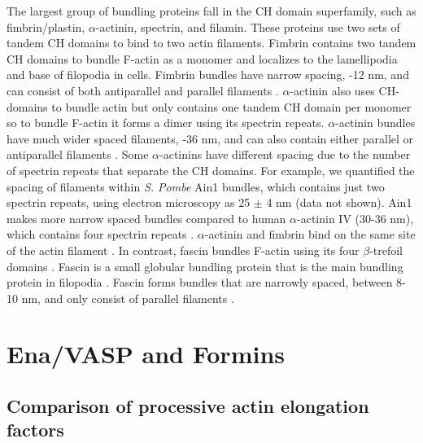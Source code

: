 The largest group of bundling proteins fall in the CH domain superfamily, such as fimbrin/plastin, $\alpha$-actinin, spectrin, and filamin. These proteins use two sets of tandem CH domains to bind to two actin filaments. Fimbrin contains two tandem CH domains to bundle F-actin as a monomer and localizes to the lamellipodia and base of filopodia in cells. Fimbrin bundles have narrow spacing, -12 nm, and can consist of both antiparallel and parallel filaments \citep{hanein_atomic_1998}. $\alpha$-actinin also uses CH-domains to bundle actin but only contains one tandem CH domain per monomer so to bundle F-actin it forms a dimer using its spectrin repeats. $\alpha$-actinin bundles have much wider spaced filaments, -36 nm, and can also contain either parallel or antiparallel filaments \citep{sjoblom_alpha-actinin_2008}. Some $\alpha$-actinins have different spacing due to the number of spectrin repeats that separate the CH domains. For example, we quantified the spacing of filaments within \textit{S. Pombe} Ain1 bundles, which contains just two spectrin repeats, using electron microscopy as 25 $\pm$ 4 nm (data not shown). Ain1 makes more narrow spaced bundles compared to human $\alpha$-actinin IV (30-36 nm), which contains four spectrin repeats \citep{murphy_actinin_2015,hampton_novel_2007,tang_three-dimensional_2001,liu_3-d_2004}. $\alpha$-actinin and fimbrin bind on the same site of the actin filament \citep{klein_structure_2004}. In contrast, fascin bundles F-actin using its four $\beta$-trefoil domains \citep{jansen_mechanism_2011}. Fascin is a small globular bundling protein that is the main bundling protein in filopodia \citep{vignjevic_role_2006,mellor_role_2010}. Fascin forms bundles that are narrowly spaced, between 8-10 nm, and only consist of parallel filaments \citep{edwards_fascins_1995,jansen_mechanism_2011,cant_drosophila_1994}. 

\section[Ena/VASP and Formins]{Ena/VASP and Formins\footnotemark}\label{ena-formin-review}


\subsection{Comparison of processive actin elongation factors}\label{comparison-why}

